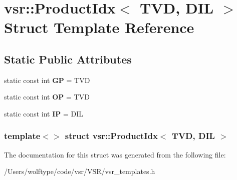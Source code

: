 \hypertarget{structvsr_1_1_product_idx_3_01_t_v_d_00_01_d_i_l_01_4}{\section{vsr\-:\-:Product\-Idx$<$ T\-V\-D, D\-I\-L $>$ Struct Template Reference}
\label{structvsr_1_1_product_idx_3_01_t_v_d_00_01_d_i_l_01_4}
}
\subsection*{Static Public Attributes}
\begin{DoxyCompactItemize}
\item 
\hypertarget{structvsr_1_1_product_idx_3_01_t_v_d_00_01_d_i_l_01_4_a546a37e51ff0dc87db6e6a575548096f}{static const int {\bfseries G\-P} = T\-V\-D}\label{structvsr_1_1_product_idx_3_01_t_v_d_00_01_d_i_l_01_4_a546a37e51ff0dc87db6e6a575548096f}

\item 
\hypertarget{structvsr_1_1_product_idx_3_01_t_v_d_00_01_d_i_l_01_4_ada2572e7172a82db7a9581c6f0ede32c}{static const int {\bfseries O\-P} = T\-V\-D}\label{structvsr_1_1_product_idx_3_01_t_v_d_00_01_d_i_l_01_4_ada2572e7172a82db7a9581c6f0ede32c}

\item 
\hypertarget{structvsr_1_1_product_idx_3_01_t_v_d_00_01_d_i_l_01_4_aad3fa0ce3fc41c2d9c4ea28d3df5e527}{static const int {\bfseries I\-P} = D\-I\-L}\label{structvsr_1_1_product_idx_3_01_t_v_d_00_01_d_i_l_01_4_aad3fa0ce3fc41c2d9c4ea28d3df5e527}

\end{DoxyCompactItemize}
\subsubsection*{template$<$$>$ struct vsr\-::\-Product\-Idx$<$ T\-V\-D, D\-I\-L $>$}



The documentation for this struct was generated from the following file\-:\begin{DoxyCompactItemize}
\item 
/\-Users/wolftype/code/vsr/\-V\-S\-R/vsr\-\_\-templates.\-h\end{DoxyCompactItemize}
